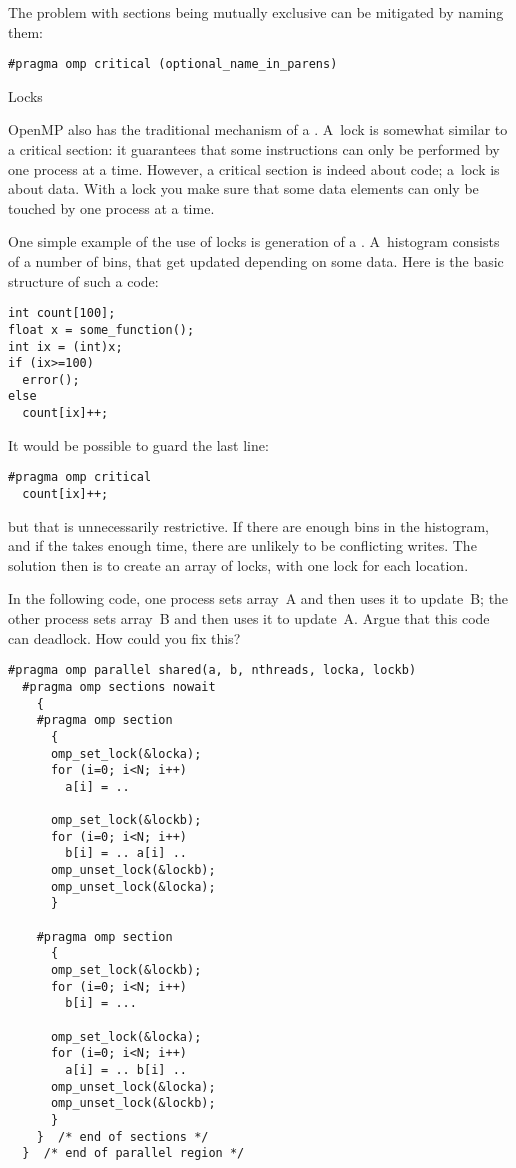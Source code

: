 The problem with  sections being mutually exclusive can be mitigated by naming them:
\begin{verbatim}
#pragma omp critical (optional_name_in_parens)
\end{verbatim}

 {Locks}

OpenMP also has the traditional mechanism of a . A~lock is somewhat similar to 
a critical section: it guarantees that some instructions can only be performed by one
process at a time. However, a critical section is indeed about code; a~lock is about data.
With a lock you make sure that some data elements can only be touched by one process at a time.

One simple example of the use of locks is generation of a .
A~histogram consists of a number of bins, that get updated depending on some data.
Here is the basic structure of such a code:
\begin{verbatim}
int count[100];
float x = some_function();
int ix = (int)x;
if (ix>=100)
  error();
else
  count[ix]++;
\end{verbatim}
It would be possible to guard the last line:
\begin{verbatim}
#pragma omp critical
  count[ix]++;
\end{verbatim}
but that is unnecessarily restrictive. If there are enough bins in the
histogram, and if the  takes enough time, there are unlikely to be
conflicting writes. The solution then is to create an array of locks, with
one lock for each  location.

\begin{exercise}
  \label{ex:loc-deadlock}
  In the following code, one process sets array~A and then uses it to
  update~B; the other process sets array~B and then uses it to
  update~A.
  Argue that this code can deadlock. How could you fix this?
\begin{verbatim}
#pragma omp parallel shared(a, b, nthreads, locka, lockb)
  #pragma omp sections nowait
    {
    #pragma omp section
      {
      omp_set_lock(&locka);
      for (i=0; i<N; i++)
        a[i] = ..

      omp_set_lock(&lockb);
      for (i=0; i<N; i++)
        b[i] = .. a[i] ..
      omp_unset_lock(&lockb);
      omp_unset_lock(&locka);
      }

    #pragma omp section
      {
      omp_set_lock(&lockb);
      for (i=0; i<N; i++)
        b[i] = ...

      omp_set_lock(&locka);
      for (i=0; i<N; i++)
        a[i] = .. b[i] ..
      omp_unset_lock(&locka);
      omp_unset_lock(&lockb);
      }
    }  /* end of sections */
  }  /* end of parallel region */
\end{verbatim}
\end{exercise}

